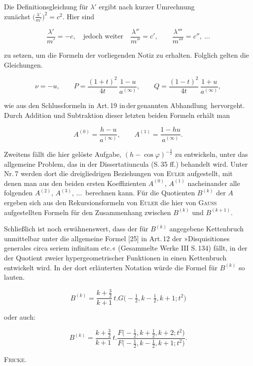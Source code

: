 %
\noindent Die Definitionsgleichung für $\lambda'$ ergibt nach kurzer Umrechnung\hfill\\
zunächst \mbox{$\bigl(\frac{\lambda'}{m'}\bigr)^{2}=c^{2}$}. Hier sind

\[
\frac{\lambda'}{m'}=-c,\quad\text{jedoch weiter}\quad
\frac{\lambda''}{m''}=c',\qquad \frac{\lambda'''}{m'''}=c'',\ \ldots
\]

\noindent zu setzen, um die Formeln der vorliegenden Notiz zu erhalten. Folglich gelten die
Gleichungen.

\[
\nu=-u,\qquad P=\frac{(1+t)^{2}}{4t}\,\frac{1-u}{a^{(\infty)}},\qquad
Q=\frac{(1-t)^{2}}{4t}\,\frac{1+u}{a^{(\infty)}},
\]

\noindent wie aus den Schlussformeln in Art.\,19 in\,der\,genannten Abhandlung\ hervorgeht. Durch Addition und
Subtraktion dieser letzten beiden Formeln erhält man

\[
A^{(0)}=\frac{h-u}{a^{(\infty)}},\qquad A^{(1)}=\frac{1-hu}{a^{(\infty)}}.
\]

Zweitens fällt die hier gelöste Aufgabe,
$(h-\cos\varphi)^{-\frac{3}{2}}$ zu entwickeln, unter das allgemeine Problem, das in der Dissertatiuncula (S.\,35 ff.)
behandelt wird. Unter Nr.\,7 werden dort die dreigliedrigen Beziehungen von \textsc{Euler}
aufgestellt, mit denen man aus den beiden ersten Koeffizienten
$A^{(0)}$, $A^{(1)}$ nacheinander alle folgenden $A^{(2)}$,
$A^{(3)}$, $\ldots$\ berechnen kann. Für die Quotienten $B^{(k)}$ der
$A$ ergeben sich aus den Rekursionsformeln von \textsc{Euler} die hier von \textsc{Gauss} aufgestellten
Formeln für den Zusammenhang zwischen $B^{(k)}$ und $B^{(k+1)}$.

Schließlich ist noch erwähnenswert, dass der für $B^{(k)}$ angegebene
Kettenbruch unmittelbar unter die allgemeine Formel [25] in Art.\,12 der »Disquisitiones
generales circa seriem infinitam etc.« (Gesammelte Werke III S.\,134) fällt, in der
der Quotient zweier hypergeometrischer Funktionen in einen Kettenbruch entwickelt wird.
In der dort erläuterten Notation würde die Formel für $B^{(k)}$
so lauten.

\[
B^{(k)}=\frac{k+\frac{3}{2}}{k+1}\,t\mathord{.} G\bigl(-\tfrac{1}{2},k-\tfrac{1}{2},k+1;t^{2}\bigr)
\]

\noindent oder auch:

\[
B^{(k)}=\frac{k+\frac{3}{2}}{k+1}\,t\mathord{.}
\frac{F\bigl(-\tfrac{1}{2},k+\tfrac{1}{2},k+2;t^{2}\bigr)}{F\bigl(-\tfrac{1}{2},k-\tfrac{1}{2},k+1;t^{2}\bigr)}.
\]

\begin{flushright}
\textsc{Fricke.}
\end{flushright}
